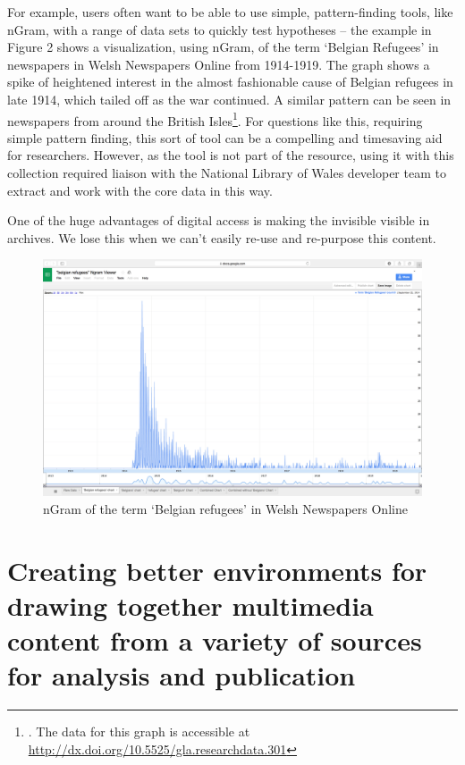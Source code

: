 \documentclass[amsthm,ebook]{saparticle}
\begin{document}
For example, users often want to be able to use simple, pattern-finding tools, like nGram, with a range of data sets to quickly test hypotheses – the example in Figure 2 shows a visualization, using nGram, of the term `Belgian Refugees' in newspapers in Welsh Newspapers Online from 1914-1919. The graph shows a spike of heightened interest in the almost fashionable cause of Belgian refugees in late 1914, which tailed off as the war continued. A similar pattern can be seen in newspapers from around the British Isles\footnote{\citet{Hughes:2016aa}. The data for this graph is accessible at \url{http://dx.doi.org/10.5525/gla.researchdata.301}}. For questions like this, requiring simple pattern finding, this sort of tool can be a compelling and timesaving aid for researchers. However, as the tool is not part of the resource, using it with this collection required liaison with the National Library of Wales developer team to extract and work with the core data in this way.

One of the huge advantages of digital access is making the invisible visible in archives. We lose this when we can’t easily re-use and re-purpose this content. 

\begin{figure}[!htbp]
\centering
 \includegraphics[scale=0.08]{img/fig2.jpg}
\caption{nGram of the term `Belgian refugees' in Welsh Newspapers Online}
\label{fig:2}
\end{figure}

\section{Creating better environments for drawing together multimedia content from a variety of sources for analysis and publication}
\end{document}

